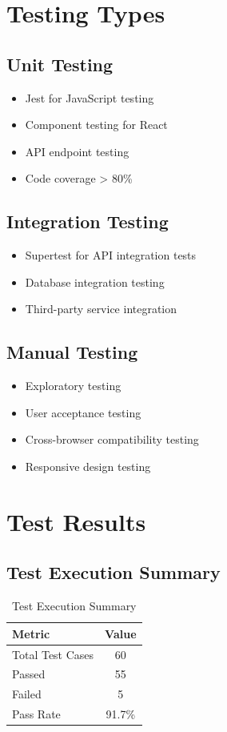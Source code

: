 \documentclass[12pt,a4paper]{report}
\begin{document}
\section{Testing Types}

\subsection{Unit Testing}
\begin{itemize}[leftmargin=*]
    \item Jest for JavaScript testing
    \item Component testing for React
    \item API endpoint testing
    \item Code coverage > 80\%
\end{itemize}

\subsection{Integration Testing}
\begin{itemize}[leftmargin=*]
    \item Supertest for API integration tests
    \item Database integration testing
    \item Third-party service integration
\end{itemize}

\subsection{Manual Testing}
\begin{itemize}[leftmargin=*]
    \item Exploratory testing
    \item User acceptance testing
    \item Cross-browser compatibility testing
    \item Responsive design testing
\end{itemize}

\section{Test Results}
\subsection{Test Execution Summary}
\begin{table}[h]
\centering
\begin{tabular}{|l|c|}
\hline
\textbf{Metric} & \textbf{Value} \\
\hline
Total Test Cases & 60 \\
\hline
Passed & 55 \\
\hline
Failed & 5 \\
\hline
Pass Rate & 91.7\% \\
\hline
\end{tabular}
\caption{Test Execution Summary}
\end{table}
\end{document}
